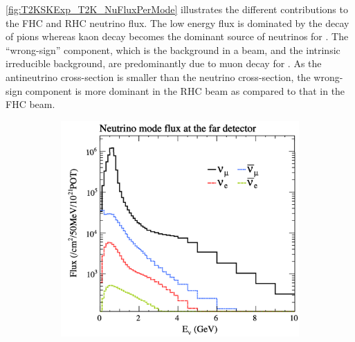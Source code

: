 \autoref{fig:T2KSKExp_T2K_NuFluxPerMode} illustrates the different contributions to the FHC and RHC neutrino flux. The low energy flux is dominated by the decay of pions whereas kaon decay becomes the dominant source of neutrinos for . The ``wrong-sign'' component, which is the \quickmath{\bar{\nu}_\mu} background in a \quickmath{\nu_\mu} beam, and the intrinsic irreducible  background, are predominantly due to muon decay for . As the antineutrino  cross-section is smaller than the neutrino cross-section, the wrong-sign component is more dominant in the RHC beam as compared to that in the FHC beam.

\begin{figure}[h]
  \begin{subfigure}[t]{0.45\textwidth}
    \includegraphics[width=\textwidth, trim={0mm 0mm 0mm 0mm}, clip,page=1]{Figures/Detectors/T2KFluxInNuMode.pdf}
  \end{subfigure}%
  \begin{subfigure}[t]{0.45\textwidth}

\end{subfigure}
\end{figure}
